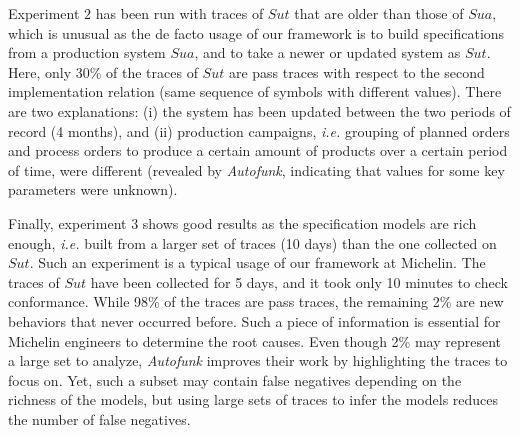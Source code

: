 Experiment $2$ has been run with traces of $\mathit{Sut}$ that
are older than those of $\mathit{Sua}$, which is unusual as the
de facto usage of our framework is to build specifications from a
production system $\mathit{Sua}$, and to take a newer or updated
system as $\mathit{Sut}$.  Here, only 30\% of the traces of
$\mathit{Sut}$ are pass traces with respect to the second
implementation relation (same sequence of symbols with different
values). There are two explanations: (i) the system has been
updated between the two periods of record (4 months), and (ii)
production campaigns, \emph{i.e.} grouping of planned orders and
process orders to produce a certain amount of products over a
certain period of time, were different (revealed by
\textit{Autofunk}, indicating that values for some key parameters
were unknown).

Finally, experiment $3$ shows good results as the specification
models are rich enough, \emph{i.e.}  built from a larger set of
traces (10 days) than the one collected on $\mathit{Sut}$. Such
an experiment is a typical usage of our framework at Michelin.
The traces of $\mathit{Sut}$ have been collected for 5 days, and
it took only 10 minutes to check conformance. While 98\% of the
traces are pass traces, the remaining 2\% are new behaviors that
never occurred before. Such a piece of information is essential
for Michelin engineers to determine the root causes. Even though
2\% may represent a large set to analyze, \textit{Autofunk}
improves their work by highlighting the traces to focus on. Yet,
such a subset may contain false negatives depending on the
richness of the models, but using large sets of traces to infer
the models reduces the number of false negatives.

